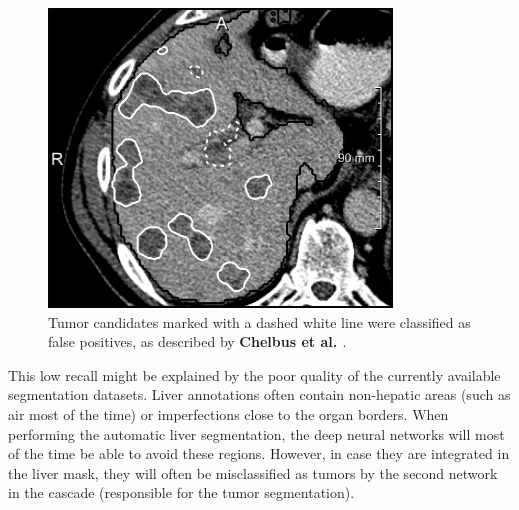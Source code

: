 \begin{figure}[th!]
\centering
\includegraphics[width=0.5\linewidth]{Perspectives/images/chlebus}
\caption{Tumor candidates marked with a dashed white line were classified as false positives, as described by \textbf{Chelbus et al. \cite{Chlebus2018}}.}
\label{fig:image5}
\end{figure}

This low recall might be explained by the poor quality of the
currently available segmentation datasets. Liver annotations often
contain non-hepatic areas (such as air most of the time) or
imperfections close to the organ borders.
When performing the automatic liver segmentation, the deep neural
networks will most of the time be able to avoid these regions. However,
in case they are integrated in the liver mask, they will often be
misclassified as tumors by the second network in the cascade
(responsible for the tumor segmentation).

